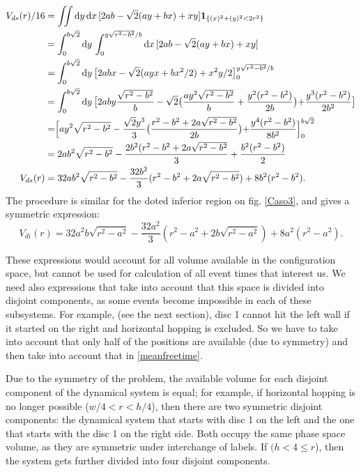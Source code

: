 \documentclass[superscriptaddress,pre,reprint,showpacs,onecolumn]{revtex4-1}
\newcommand{\rd}[1]{\mathrm{d}{#1} \,}
\newcommand{\indicatorsymbol}{\mathbf{1}}
\newcommand{\indicator}[1]{\indicatorsymbol_{ \{   #1 \} } }
\begin{document}
\begin{equation}
  \begin{split}
    V_{ds}(r) /16 &=\iint \rd y \rd x [2ab-\sqrt{2}(ay+bx)+xy] \indicator{(x)^2+(y)^2<2r^2 }\\
    &=\int_0^{b\sqrt{2}}\rd y \int_{0}^{y\sqrt{r^2-b^2}/b} \rd x [2ab-\sqrt{2}(ay+bx)+xy] \\
   &=\int_0^{b\sqrt{2}}\rd y \bigl[2abx-\sqrt{2}(ayx+bx^2/2)+x^2y/2\bigr]_{0}^{y\sqrt{r^2-b^2}/b} \\
      &=\int_0^{b\sqrt{2}}\rd y
        \bigr[
          2aby\frac{\sqrt{r^2-b^2}}{b}
          -\sqrt{2}
          \bigr(
          \frac{ay^2\sqrt{r^2-b^2}}{b}
            +\frac{y^2(r^2-b^2)}{2b}
            \bigl)
           +\frac{y^3(r^2-b^2)}{2b^2}
           \bigl]\\
        &= \Bigr[ay^2\sqrt{r^2-b^2}-
          \frac{\sqrt{2}y^3}{3}
          \bigr(
          \frac{r^2-b^2+2a\sqrt{r^2-b^2}}{2b}
            \bigl)
            +\frac{y^4(r^2-b^2)}{8b^2}
            \Bigl]_0^{b\sqrt{2}}\\
          &=2ab^2\sqrt{r^2-b^2}
          -\frac{2b^2(r^2-b^2+2a\sqrt{r^2-b^2}}{3}+\frac{b^2(r^2-b^2)}{2}\\
          V_{ds}(r)&=32ab^2\sqrt{r^2-b^2} -\frac{32
            b^2}{3}(r^2-b^2+2a\sqrt{r^2-b^2}) +8b^2(r^2-b^2).
  \end{split}
  \end{equation}
The procedure is similar for the doted inferior region on fig. \ref{Caso3},
and gives a symmetric expression:
\begin{equation}
          V_{di}(r)=32a^2b\sqrt{r^2-a^2} -\frac{32
            a^2}{3}(r^2-a^2+2b\sqrt{r^2-a^2}) +8a^2(r^2-a^2).
\end{equation}

These expressions would account for all volume available in the configuration space, but
cannot be used for calculation of all event times that interest us. We need also
expressions that take into account that this space is divided into disjoint components,
as some events become impossible in each of these subsystems. For example,
(see the next section), disc 1 cannot hit the left wall if
it started on the right and horizontal hopping is excluded. So we have to
take into account that only half of the positions are available (due to symmetry)
and then take into account that in \eqref{meanfreetime}.

Due to the symmetry of the problem, the available volume
for each disjoint component of the dynamical system is equal; for example, if horizontal hopping is no longer possible
($w/4<r<h/4$), then there are two symmetric disjoint components: the dynamical system
that starts with disc 1 on the left and the one that starts with the disc 1 on
the right side. Both occupy the same phase space volume, as they are
symmetric under interchange of labels. If $(h<4\leq r$), then the system gets further
divided into four disjoint components. 
\end{document}
